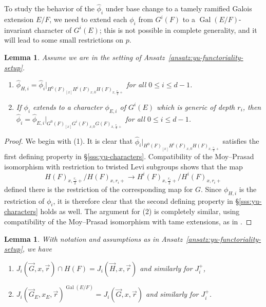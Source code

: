 \documentclass[reqno]{amsart}
\numberwithin{equation}{subsection}
\newcommand{\Gal}{\operatorname{Gal}}
\newcommand{\wh}[1]{\widehat{#1}}
\newtheorem{lemma}[thm]{Lemma}
\theoremstyle{remark}
\numberwithin{equation}{subsection}
\numberwithin{figure}{subsection}
\begin{document}
To study the behavior of the $\wh\phi_i$ under base change to a tamely ramified Galois extension $E/F$, we need to extend each $\phi_i$ from $G^i(F)$ to a $\Gal(E/F)$-invariant character of $G^i(E)$; this is not possible in complete generality, and it will lead to some small restrictions on $p$.

\begin{lemma}\label{lemma:yu-hat-functoriality}
Assume we are in the setting of Ansatz~\ref{ansatz:yu-functoriality-setup}.
\begin{enumerate}
    \item $\wh\phi_{H,i} = \wh\phi_i|_{H^0(F)_{[x]}H^i(F)_{x,0}H(F)_{x,\frac{r_i}{2}+}}$ for all $0 \leq i \leq d-1$.
    \item If $\phi_i$ extends to a character $\phi_{E,i}$ of $G^i(E)$ which is generic of depth $r_i$, then $\wh\phi_i = \wh\phi_{E,i}|_{G^0(F)_{[x]}G^i(F)_{x,0}G(F)_{x,\frac{r_i}{2}+}}$ for all $0 \leq i \leq d-1$.
\end{enumerate}
\end{lemma}

\begin{proof}
We begin with (1). It is clear that $\wh\phi_i|_{H^0(F)_{[x]}H^i(F)_{x,0}H(F)_{x,\frac{r_i}{2}+}}$ satisfies the first defining property in \S\ref{sss:yu-characters}. Compatibility of the Moy--Prasad isomorphism with restriction to twisted Levi subgroups shows that the map
\[
H(F)_{x,\frac{r_i}{2}+}/H(F)_{x,r_i+} \to H^i(F)_{x,\frac{r_i}{2}+}/H^i(F)_{x,r_i+}
\]
defined there is the restriction of the corresponding map for $G$. Since $\phi_{H,i}$ is the restriction of $\phi_i$, it is therefore clear that the second defining property in \S\ref{sss:yu-characters} holds as well. The argument for (2) is completely similar, using compatibility of the Moy--Prasad isomorphism with tame extensions, as in \cite[Corollary 2.4]{Yu01}.
\end{proof}

\begin{lemma}\label{lemma:yu-Ji-fixed}
With notation and assumptions as in Ansatz~\ref{ansatz:yu-functoriality-setup}, we have
\begin{enumerate}
    \item $J_i(\vec{G}, x, \vec{r}) \cap H(F) = J_i(\vec{H}, x, \vec{r})$ and similarly for $J_i^+$,
    \item $J_i(\vec{G}_E,x_E,\vec{r})^{\Gal(E/F)} = J_i(\vec{G},x,\vec{r})$ and similarly for $J_i^+$.
\end{enumerate}
\end{lemma}
\end{document}

